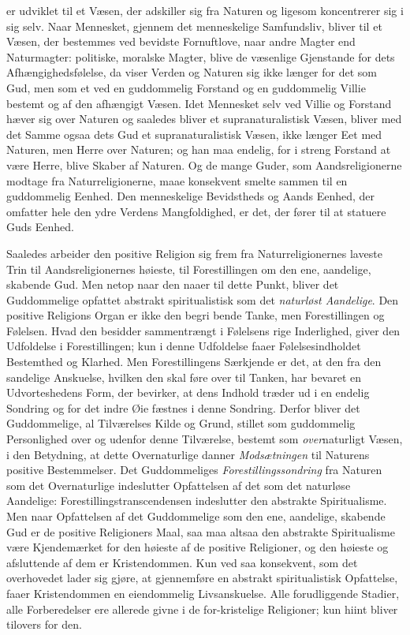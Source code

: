 \documentclass[12pt,a4paper,openany]{book}
\newcommand{\opage}[1]{\marginnote{\footnotesize\textit{[#1]}}}
\begin{document}
er udviklet til et Væsen, der adskiller sig fra Naturen og
ligesom koncentrerer sig i sig selv. Naar Mennesket, gjennem
det menneskelige Samfundsliv, bliver til et Væsen, der bestemmes
ved bevidste Fornuftlove, naar andre Magter end
Naturmagter: politiske, moralske Magter, blive de væsenlige
Gjenstande for dets Afhængighedsfølelse, da viser Verden og
Naturen sig ikke længer for det som Gud, men som et ved
en guddommelig Forstand og en guddommelig Villie bestemt
og af den afhængigt Væsen. Idet Mennesket selv ved Villie
og Forstand hæver sig over Naturen og saaledes bliver et
supranaturalistisk Væsen, bliver med det Samme ogsaa dets
Gud et supranaturalistisk Væsen, ikke længer Eet med Naturen,
men Herre over Naturen; og han maa endelig, for
i streng Forstand at være Herre, blive Skaber af Naturen.
Og de mange Guder, som Aandsreligionerne modtage fra
Naturreligionerne, maae konsekvent smelte sammen til en guddommelig
Eenhed. Den menneskelige Bevidstheds og Aands
Eenhed, der omfatter hele den ydre Verdens Mangfoldighed,
er det, der fører til at statuere Guds Eenhed.

Saaledes arbeider den positive Religion sig frem fra
Naturreligionernes laveste Trin til Aandsreligionernes høieste,
til Forestillingen om den ene, aandelige, skabende Gud. Men
netop naar den naaer til dette Punkt, bliver det Guddommelige
opfattet abstrakt spiritualistisk som det \emph{naturløst Aandelige}.
Den positive Religions Organ er ikke den begri%
\opage{449}bende Tanke, men Forestillingen og Følelsen. Hvad den besidder
sammentrængt i Følelsens rige Inderlighed, giver den
Udfoldelse i Forestillingen; kun i denne Udfoldelse faaer
Følelsesindholdet Bestemthed og Klarhed. Men Forestillingens
Særkjende er det, at den fra den sandelige Anskuelse, hvilken
den skal føre over til Tanken, har bevaret en Udvorteshedens
Form, der bevirker, at dens Indhold træder ud i en endelig
Sondring og for det indre Øie fæstnes i denne Sondring.
Derfor bliver det Guddommelige, al Tilværelses Kilde og
Grund, stillet som guddommelig Personlighed over og udenfor
denne Tilværelse, bestemt som \emph{over}naturligt Væsen, i den
Betydning, at dette Overnaturlige danner \emph{Modsætningen}
til Naturens positive Bestemmelser. Det Guddommeliges
\emph{Forestillingssondring} fra Naturen som det Overnaturlige
indeslutter Opfattelsen af det som det naturløse Aandelige:
Forestillingstranscendensen indeslutter den abstrakte Spiritualisme.
Men naar Opfattelsen af det Guddommelige som
den ene, aandelige, skabende Gud er de positive Religioners
Maal, saa maa altsaa den abstrakte Spiritualisme være
Kjendemærket for den høieste af de positive Religioner,
og den høieste og afsluttende af dem er Kristendommen.
Kun ved saa konsekvent, som det overhovedet lader sig gjøre,
at gjennemføre en abstrakt spiritualistisk Opfattelse, faaer
Kristendommen en eiendommelig Livsanskuelse. Alle forudliggende
Stadier, alle Forberedelser ere allerede givne i de
for-kristelige Religioner; kun hiint bliver tilovers for den.
\end{document}
